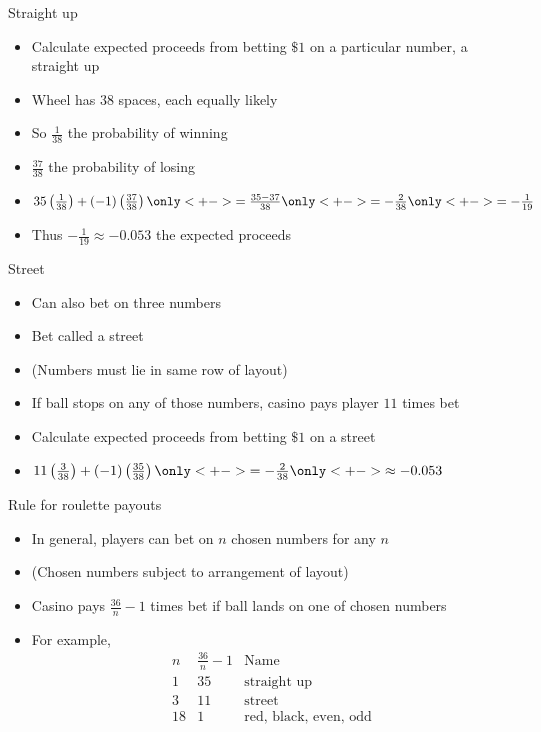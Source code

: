 \documentclass[handout]{beamer}
\theoremstyle{definition}
\begin{document}
\begin{frame}{Straight up}
\begin{itemize}
\item Calculate expected proceeds from betting $\$1$
on a particular number, a \alert{straight up}
\item Wheel has $38$ spaces, each equally likely
\item So $\frac{1}{38}$ the probability of winning
\item $\frac{37}{38}$ the probability of losing
\item $35\left(\frac{1}{38}\right)
+\left(-1\right)\left(\frac{37}{38}\right)
\only<+->{=\frac{35-37}{38}}
\only<+->{=-\frac{2}{38}}
\only<+->{=-\frac{1}{19}}$
\item Thus $-\frac{1}{19}\approx -0.053$ the expected proceeds
\end{itemize}
\end{frame}

\begin{frame}{Street}
\begin{itemize}
\item Can also bet on three numbers
\item Bet called a \alert{street}
\item (Numbers must lie in same row of \alert{layout})
\item If ball stops on any of those numbers, casino
pays player $11$ times bet
\item Calculate expected proceeds from betting $\$1$ on a street
\item $11\left(\frac{3}{38}\right)+\left(-1\right)\left(\frac{35}{38}\right)
\only<+->{=-\frac{2}{38}}
\only<+->{\approx -0.053}$
\end{itemize}
\end{frame}

\begin{frame}{Rule for roulette payouts} 
\begin{itemize}
\item In general, players can bet on $n$
chosen numbers for any $n$
\item (Chosen numbers subject to arrangement of layout)
\item Casino pays $\frac{36}{n}-1$ times
bet if ball lands on one of chosen numbers
\item For example,
\[\begin{array}{l|c|l}
n&\frac{36}{n}-1&\text{Name}\\\hline
1&35&\text{straight up}\\
3&11&\text{street}\\
18&1&\text{red, black, even, odd}
\end{array}\]
\end{itemize}
\end{frame}
\end{document}
